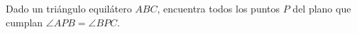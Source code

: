 Dado un triángulo equilátero $ABC$, encuentra todos los puntos $P$ del plano que cumplan $\angle APB=\angle BPC$.